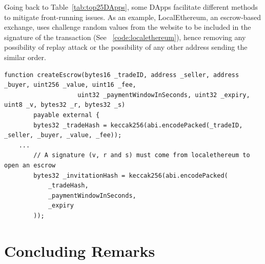 
Going back to Table~\ref{tab:top25DApps}, some DApps facilitate different methods to mitigate front-running issues. As an example, LocalEthereum, an escrow-based exchange, uses challenge random values from the website to be included in the signature of the transaction (See ~\ref{code:localethereum}), hence removing any possibility of replay attack or the possibility of any other address sending the similar order.

\begin{lstlisting}[basicstyle=\scriptsize\ttfamily,caption={Code snippet from LocalEthereum smart contract. Values V,R and S are set by LocalEtherem to have a valid signature, also the tradeHash uses buyer and seller addresses, mitigating the possibility of front-running by a third party.},label={code:localethereum},float]
    function createEscrow(bytes16 _tradeID, address _seller, address _buyer, uint256 _value, uint16 _fee,
					uint32 _paymentWindowInSeconds, uint32 _expiry, uint8 _v, bytes32 _r, bytes32 _s) 
        payable external {
        bytes32 _tradeHash = keccak256(abi.encodePacked(_tradeID, _seller, _buyer, _value, _fee));
	...
        // A signature (v, r and s) must come from localethereum to open an escrow
        bytes32 _invitationHash = keccak256(abi.encodePacked(
            _tradeHash,
            _paymentWindowInSeconds,
            _expiry
        )); 
\end{lstlisting}





\section{Concluding Remarks}





